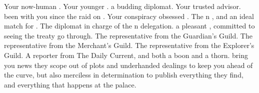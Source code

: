 \documentclass[char]{NeptuneBall}
\begin{document}
\begin{contacts}
  \contact{\cAriel{}} Your now-human \cAriel{\offspring}.
  \contact{\cPrincess{}} Your younger \cPrincess{\offspring}. \cPrincess{\They} \cPrincess{\are} a budding diplomat.
  \contact{\cManta{}} Your trusted advisor. \cManta{\They{}} \cManta{\have} been with you since the raid on \pPacifica{}.
  \contact{\cPlant{}} Your conspiracy obsessed \cPlant{\sibling}.
  \contact{\cPrince{}} The \pPacifica{}n \cPrince{\prince}, and an ideal match for \cPrincess{}.
  \contact{\cDiplomat{}} The diplomat in charge of the \pPacifica{}n delegation. \cDiplomat{\They} \cDiplomat{\are} a pleasant \cDiplomat{\mer}, committed to seeing the treaty go through.
  \contact{\cGeneral{}} The representative from the Guardian's Guild.
  \contact{\cSlave{}} The representative from the Merchant's Guild.
  \contact{\cPriest{}} The representative from the Explorer's Guild.
	\contact{\cReporter{}} A reporter from The Daily Current, and both a boon and a thorn. \cReporter{\They} bring you news they scope out of plots and underhanded dealings to keep you ahead of the curve, but \cReporter{\they} \cReporter{\are} also merciless in \cReporter{\their} determination to publish everything they find, and everything that happens at the palace.
\end{contacts}
\end{document}
